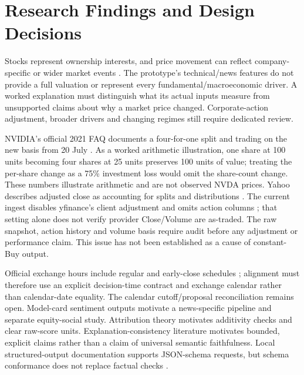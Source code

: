 \section{Research Findings and Design Decisions}
Stocks represent ownership interests, and price movement can reflect company-specific or wider market events \cite{sec_stocks}. The prototype's technical/news features do not provide a full valuation or represent every fundamental/macroeconomic driver. A worked explanation must distinguish what its actual inputs measure from unsupported claims about why a market price changed. Corporate-action adjustment, broader drivers and changing regimes still require dedicated review.

NVIDIA's official 2021 FAQ documents a four-for-one split and trading on the new basis from 20 July \cite{nvda_split_2021}. As a worked arithmetic illustration, one share at 100 units becoming four shares at 25 units preserves 100 units of value; treating the per-share change as a 75\% investment loss would omit the share-count change. These numbers illustrate arithmetic and are not observed NVDA prices. Yahoo describes adjusted close as accounting for splits and distributions \cite{yahoo_adjusted_close}. The current ingest disables yfinance's client adjustment and omits action columns \cite{yfinance_download}; that setting alone does not verify provider Close/Volume are as-traded. The raw snapshot, action history and volume basis require audit before any adjustment or performance claim. This issue has not been established as a cause of constant-Buy output.

Official exchange hours include regular and early-close schedules \cite{nyse_calendar}; alignment must therefore use an explicit decision-time contract and exchange calendar rather than calendar-date equality. The calendar cutoff/proposal reconciliation remains open. Model-card sentiment outputs motivate a news-specific pipeline and separate equity-social study. Attribution theory motivates additivity checks and clear raw-score units. Explanation-consistency literature motivates bounded, explicit claims rather than a claim of universal semantic faithfulness. Local structured-output documentation supports JSON-schema requests, but schema conformance does not replace factual checks \cite{lmstudio_structured}.
